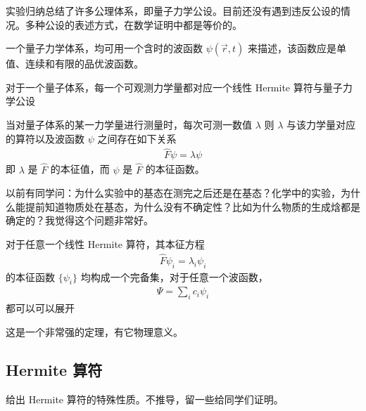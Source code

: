 实验归纳总结了许多公理体系，即量子力学公设。目前还没有遇到违反公设的情况。多种公设的表述方式，在数学证明中都是等价的。

\begin{theorem}[公设1]
    一个量子力学体系，均可用一个含时的波函数 $\psi(\vec r, t)$ 来描述，该函数应是单值、连续和有限的品优波函数。
\end{theorem}

\begin{theorem}[公设2]
对于一个量子体系，每一个可观测力学量都对应一个线性 Hermite 算符与量子力学公设
\end{theorem}

\begin{theorem}[公设3]
当对量子体系的某一力学量进行测量时，每次可测一数值 $\lambda$ 则 $\lambda$ 与该力学量对应的算符以及波函数 $\psi$ 之间存在如下关系
\begin{eqnarray}
    \hat F \psi =\lambda \psi
\end{eqnarray}
即 $\lambda$ 是 $\hat F$ 的本征值，而 $\psi$ 是 $\hat F$ 的本征函数。
\end{theorem}

以前有同学问：为什么实验中的基态在测完之后还是在基态？化学中的实验，为什么能提前知道物质处在基态，为什么没有不确定性？比如为什么物质的生成焓都是确定的？我觉得这个问题非常好。

\begin{theorem}[公设4]
对于任意一个线性 Hermite 算符，其本征方程
\begin{eqnarray}
    \hat F \psi_i = \lambda_i \psi_i
\end{eqnarray}
的本征函数 $\{\psi_i\}$ 均构成一个完备集，对于任意一个波函数，
\begin{eqnarray}
    \Psi = \sum_i c_i \psi_i
\end{eqnarray}
都可以可以展开
\end{theorem}

这是一个非常强的定理，有它物理意义。

\subsection{Hermite 算符}
给出 Hermite 算符的特殊性质。不推导，留一些给同学们证明。

